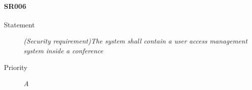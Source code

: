 
\paragraph{SR006}
\begin{description}
  \item [Statement] 
    \textit{(Security requirement)The system shall contain a user access management system inside a conference}
  \item [Priority] \textit{A}
\end{description}


